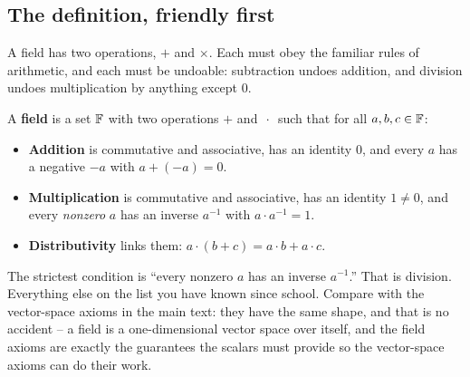 \subsection{The definition, friendly first}

A field has two operations, $+$ and $\times$. Each must obey the familiar rules of
arithmetic, and each must be undoable: subtraction undoes addition, and division undoes
multiplication by anything except $0$.

\begin{formalbox}
A \textbf{field} is a set $\mathbb{F}$ with two operations $+$ and $\,\cdot\,$ such that for all
$a,b,c \in \mathbb{F}$:
\begin{itemize}
  \item \textbf{Addition} is commutative and associative, has an identity $0$, and every
        $a$ has a negative $-a$ with $a + (-a) = 0$.
  \item \textbf{Multiplication} is commutative and associative, has an identity $1 \ne 0$,
        and every \emph{nonzero} $a$ has an inverse $a^{-1}$ with $a \cdot a^{-1} = 1$.
  \item \textbf{Distributivity} links them: $a\cdot(b+c) = a\cdot b + a\cdot c$.
\end{itemize}
\end{formalbox}

The strictest condition is ``every nonzero $a$ has an inverse $a^{-1}$.'' That is
division. Everything else on the list you have known since school. Compare with
the vector-space axioms in the main text: they have the same shape, and that is no
accident -- a field is a one-dimensional vector space over
itself, and the field axioms are exactly the guarantees the scalars must provide so the
vector-space axioms can do their work.

